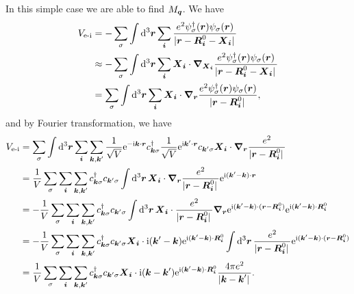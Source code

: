 \documentclass[hyperref, a4paper]{article}
\newcommand*{\ii}{\mathrm{i}}
\newcommand*{\ee}{\mathrm{e}}
\begin{document}
In this simple case we are able to find $M_{\vb*{q}}$. We have 
\[
    \begin{aligned}
        V_\text{e-i} &= - \sum_\sigma \int \dd[3]{\vb*{r}} \sum_{\vb*{i}} \frac{e^2 \psi^\dagger_\sigma(\vb*{r}) \psi_\sigma(\vb*{r})}{\abs*{\vb*{r} - \vb*{R}_{\vb*{i}}^0 - \vb*{X}_{\vb*{i}}}} \\
        &\approx - \sum_\sigma \int \dd[3]{\vb*{r}} \sum_{\vb*{i}} \vb*{X}_{\vb*{i}} \cdot \grad_{\vb*{X}_{\vb*{i}}} \frac{e^2 \psi^\dagger_\sigma(\vb*{r}) \psi_\sigma(\vb*{r})}{\abs*{\vb*{r} - \vb*{R}_{\vb*{i}}^0 - \vb*{X}_{\vb*{i}}}} \\
        &= \sum_\sigma \int \dd[3]{\vb*{r}} \sum_{\vb*{i}} \vb*{X}_{\vb*{i}} \cdot \grad_{\vb*{r}} \frac{e^2 \psi^\dagger_\sigma(\vb*{r}) \psi_\sigma(\vb*{r})}{\abs*{\vb*{r} - \vb*{R}_{\vb*{i}}^0 }} ,
    \end{aligned}
\]
and by Fourier transformation, we have 
\[
    \begin{aligned}
        V_\text{e-i} &= \sum_\sigma \int \dd[3]{\vb*{r}} \sum_{\vb*{i}} \sum_{\vb*{k}, \vb*{k}'} \frac{1}{\sqrt{V}} \ee^{- \ii \vb*{k} \cdot \vb*{r}} c^\dagger_{\vb*{k} \sigma} \frac{1}{\sqrt{V}} \ee^{\ii \vb*{k}' \cdot \vb*{r}} c_{\vb*{k}' \sigma} \vb*{X}_{\vb*{i}} \cdot \grad_{\vb*{r}} \frac{ e^2}{\abs*{\vb*{r} - \vb*{R}_{\vb*{i}}^0 }} \\
        &= \frac{1}{V} \sum_{\sigma} \sum_{\vb*{i}} \sum_{\vb*{k}, \vb*{k}'} c^\dagger_{\vb*{k} \sigma} c_{\vb*{k}' \sigma} \int \dd[3]{\vb*{r}} \vb*{X}_{\vb*{i}} \cdot \grad_{\vb*{r}} \frac{e^2}{\abs*{\vb*{r} - \vb*{R}^0_{\vb*{i}} }} \ee^{\ii (\vb*{k}' - \vb*{k}) \cdot \vb*{r}} \\
        &= - \frac{1}{V} \sum_{\sigma} \sum_{\vb*{i}} \sum_{\vb*{k}, \vb*{k}'} c^\dagger_{\vb*{k} \sigma} c_{\vb*{k}' \sigma} \int \dd[3]{\vb*{r}} \vb*{X}_{\vb*{i}} \cdot \frac{e^2}{\abs*{\vb*{r} - \vb*{R}^0_{\vb*{i}} }} \grad_{\vb*{r}} \ee^{\ii (\vb*{k}' - \vb*{k}) \cdot (\vb*{r} - \vb*{R}_{\vb*{i}}^0 )} \ee^{\ii (\vb*{k}' - \vb*{k}) \cdot \vb*{R}^0_{\vb*{i}}} \\
        &=  - \frac{1}{V} \sum_{\sigma} \sum_{\vb*{i}} \sum_{\vb*{k}, \vb*{k}'} c^\dagger_{\vb*{k} \sigma} c_{\vb*{k}' \sigma} \vb*{X}_{\vb*{i}} \cdot \ii (\vb*{k}' - \vb*{k}) \ee^{\ii (\vb*{k}' - \vb*{k}) \cdot \vb*{R}^0_{\vb*{i}}} \int \dd[3]{\vb*{r}} \frac{e^2}{\abs*{\vb*{r} - \vb*{R}^0_{\vb*{i}} }}  \ee^{\ii (\vb*{k}' - \vb*{k}) \cdot (\vb*{r} - \vb*{R}_{\vb*{i}}^0 )} \\
        &= \frac{1}{V} \sum_{\sigma} \sum_{\vb*{i}} \sum_{\vb*{k}, \vb*{k}'} c^\dagger_{\vb*{k} \sigma} c_{\vb*{k}' \sigma} \vb*{X}_{\vb*{i}} \cdot \ii (\vb*{k} - \vb*{k}') \ee^{\ii (\vb*{k}' - \vb*{k}) \cdot \vb*{R}^0_{\vb*{i}}} \frac{4 \pi e^2}{\abs*{\vb*{k} - \vb*{k}'}}.
    \end{aligned}
\]
\end{document}
